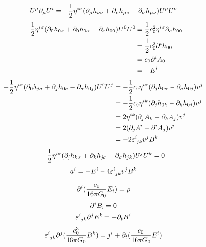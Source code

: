 \begin{equation}
    U^\mu\partial_\mu U^i=-\frac{1}{2}\eta^{i\sigma}(\partial_\mu{h}_{\nu\sigma}+\partial_\nu{h}_{\mu\sigma}-\partial_\sigma{h}_{\mu\nu})U^\mu U^\nu
\end{equation}
\begin{align}
    -\frac{1}{2}\eta^{i\sigma}(\partial_0{h}_{0\sigma}+\partial_0{h}_{0\sigma}-\partial_\sigma{h}_{00})U^0 U^0
    &=\frac{1}{2}c_0^2\eta^{i\sigma}\partial_\sigma{h}_{00}\\
    &=\frac{1}{2}c_0^2\partial^i{h}_{00}\\
    &=c_0\partial^iA_0\\
    &=-E^i
\end{align}
\begin{align}
    -\frac{1}{2}\eta^{i\sigma}(\p_0{h}_{j\sigma}+\p_j{h}_{0\sigma}-\p_\sigma{h}_{0j})U^0 U^j
    &=-\frac{1}{2}c_0\eta^{i\sigma}(\p_j{h}_{0\sigma}-\p_\sigma{h}_{0j})v^j\\
    &=-\frac{1}{2}c_0\eta^{ik}(\p_j{h}_{0k}-\p_k{h}_{0j})v^j\\
    &=2\eta^{ik}(\p_jA_k-\p_kA_j)v^j\\
    &=2(\p_jA^i-\p^iA_j)v^j\\
    &=-2\varepsilon^{i}_{\ph{i}jk}v^jB^k
\end{align}
\begin{align}
    -\frac{1}{2}\eta^{i\sigma}(\partial_j{h}_{k\sigma}+\partial_k{h}_{j\sigma}-\partial_\sigma{h}_{jk})U^j U^k=0
\end{align}
\begin{equation}
    a^i=-E^i-4\varepsilon^{i}_{\ph{i}jk}v^jB^k
\end{equation}

\begin{equation}
    \partial^i(\frac{c_0}{16\pi G_0}E_i)=\rho
\end{equation}
\begin{equation}
    \partial^iB_i=0
\end{equation}
\begin{equation}
    \varepsilon^{i}_{\ph{i}jk}\p^jE^k=-\p_tB^i
\end{equation}
\begin{equation}
    \varepsilon^{i}_{\ph{i}jk}\p^j(\frac{c_0^3}{16\pi G_0}B^k)=j^i+\p_t(\frac{c_0}{16\pi G_0}E^i)
\end{equation}

